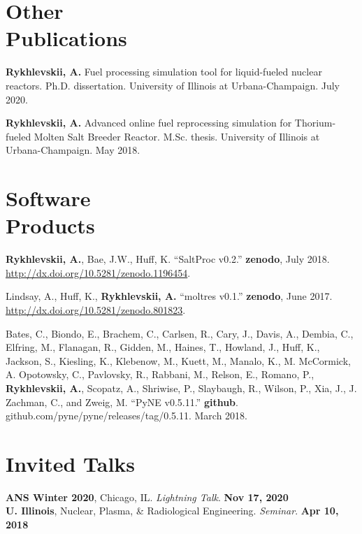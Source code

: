 \documentclass[margin,line]{resume}
\begin{document}
\begin{resume}
\section{\mysidestyle Other\\Publications}
\begin{bibenum}
	\item \textbf{Rykhlevskii, A.} Fuel processing simulation tool for
	liquid-fueled nuclear reactors.
	Ph.D. dissertation. University of Illinois at Urbana-Champaign.  July 2020.
	\item \textbf{Rykhlevskii, A.} Advanced  online fuel reprocessing 
	simulation for Thorium-fueled Molten Salt Breeder Reactor.
	M.Sc. thesis. University of Illinois at Urbana-Champaign.  May 2018.
\end{bibenum}
\section{\mysidestyle Software\\Products}
\begin{bibenum}
	\item \textbf{Rykhlevskii, A.}, Bae, J.W., Huff, K. ``SaltProc v0.2.'' 
	\textbf{zenodo}, July 2018.
	\url{http://dx.doi.org/10.5281/zenodo.1196454}.
	
	\item Lindsay, A., Huff, K., \textbf{Rykhlevskii, A.} ``moltres v0.1.'' 
	\textbf{zenodo}, June 2017. \url{http://dx.doi.org/10.5281/zenodo.801823}.
	
	\item Bates, C., Biondo, E., Brachem, C., Carlsen, R., Cary, J., Davis, 
	A., Dembia, C., Elfring, M., Flanagan, R., Gidden, M., Haines, T., 
	Howland, J., Huff, K., Jackson, S., Kiesling, K., Klebenow, M., Kuett, M., 
	Manalo, K., M. McCormick, A. Opotowsky, C., Pavlovsky, R., Rabbani, M., 
	Relson, E., Romano, P., \textbf{Rykhlevskii, A.}, Scopatz, A., Shriwise, 
	P., Slaybaugh, R., Wilson, P., Xia, J., J. Zachman, C., and Zweig, M. 
	``PyNE v0.5.11.'' \textbf{github}. 
	github.com/pyne/pyne/releases/tag/0.5.11. March 2018. 
\end{bibenum}
    \section{\mysidestyle Invited Talks}
      \textbf{ANS Winter 2020}, Chicago, IL. \emph{Lightning Talk}.  
      \hfill\textbf{Nov 17, 2020}\\
      \textbf{U. Illinois}, Nuclear, Plasma, \& Radiological Engineering. \emph{Seminar}.  \hfill\textbf{Apr 10, 2018}\\

\end{resume}
\end{document}
